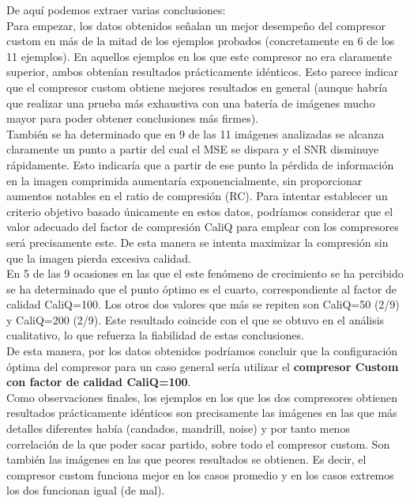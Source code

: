 \documentclass[12pt,a4paper]{article}
\begin{document}
De aquí podemos extraer varias conclusiones:\\

Para empezar, los datos obtenidos señalan un mejor desempeño del compresor custom en más de la mitad de los ejemplos probados (concretamente en 6 de los 11 ejemplos). En aquellos ejemplos en los que este compresor no era claramente superior, ambos obtenían resultados prácticamente idénticos. Esto parece indicar que el compresor custom obtiene mejores resultados en general (aunque habría que realizar una prueba más exhaustiva con una batería de imágenes mucho mayor para poder obtener conclusiones más firmes).\\

También se ha determinado que en 9 de las 11 imágenes analizadas se alcanza claramente un punto a partir del cual el MSE se dispara y el SNR disminuye rápidamente. Esto indicaría que a partir de ese punto la pérdida de información en la imagen comprimida aumentaría exponencialmente, sin proporcionar aumentos notables en el ratio de compresión (RC). Para intentar establecer un criterio objetivo basado únicamente en estos datos, podríamos considerar que el valor adecuado del factor de compresión CaliQ para emplear con los compresores será precisamente este. De esta manera se intenta maximizar la compresión sin que la imagen pierda excesiva calidad.\\

En 5 de las 9 ocasiones en las que el este fenómeno de crecimiento se ha percibido se ha determinado que el punto óptimo es el cuarto, correspondiente al factor de calidad CaliQ=100. Los otros dos valores que más se repiten son CaliQ=50 (2/9) y CaliQ=200 (2/9). Este resultado coincide con el que se obtuvo en el análisis cualitativo, lo que refuerza la fiabilidad de estas conclusiones.\\

De esta manera, por los datos obtenidos podríamos concluir que la configuración óptima del compresor para un caso general sería utilizar el \textbf{compresor Custom con factor de calidad CaliQ=100}. \\

Como observaciones finales, los ejemplos en los que los dos compresores obtienen resultados prácticamente idénticos son precisamente las imágenes en las que más detalles diferentes había (candados, mandrill, noise) y por tanto menos correlación de la que poder sacar partido, sobre todo el compresor custom. Son también las imágenes en las que peores resultados se obtienen. Es decir, el compresor custom funciona mejor en los casos promedio y en los casos extremos los dos funcionan igual (de mal).\\
\end{document}
